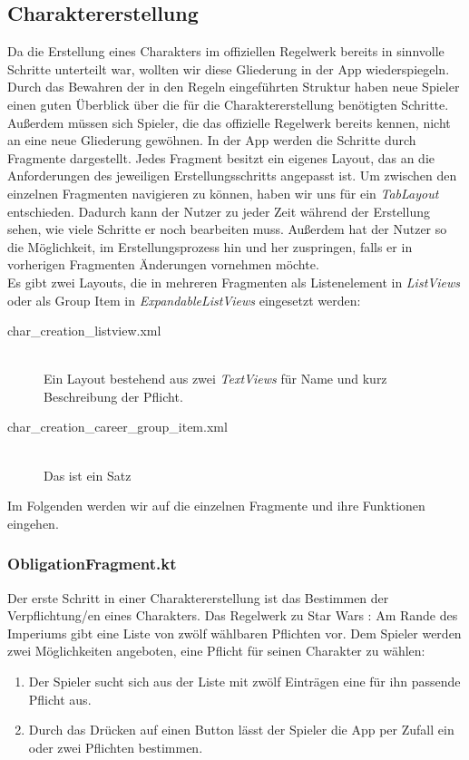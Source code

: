 \subsection{Charaktererstellung}
Da die Erstellung eines Charakters im offiziellen Regelwerk bereits in sinnvolle Schritte unterteilt war, wollten wir diese Gliederung in der App wiederspiegeln. Durch das Bewahren der in den Regeln eingeführten Struktur haben neue Spieler einen guten Überblick über die für die Charaktererstellung benötigten Schritte. Außerdem müssen sich Spieler, die das offizielle Regelwerk bereits kennen, nicht an eine neue Gliederung gewöhnen. In der App werden die Schritte durch Fragmente dargestellt. Jedes Fragment besitzt ein eigenes Layout, das an die Anforderungen des jeweiligen Erstellungsschritts angepasst ist. Um zwischen den einzelnen Fragmenten navigieren zu können, haben wir uns für ein \textit{TabLayout} entschieden. Dadurch kann der Nutzer zu jeder Zeit während der Erstellung sehen, wie viele Schritte er noch bearbeiten muss. Außerdem hat der Nutzer so die Möglichkeit, im Erstellungsprozess hin und her zuspringen, falls er in vorherigen Fragmenten Änderungen vornehmen möchte.\\

Es gibt zwei Layouts, die in mehreren Fragmenten als Listenelement in \textit{ListViews} oder als Group Item in \textit{ExpandableListViews} eingesetzt werden:
\begin{description}
\item[char\_creation\_listview.xml]\mbox{}\\ Ein Layout bestehend aus zwei \textit{TextViews} für Name und kurz Beschreibung der Pflicht.

\item[char\_creation\_career\_group\_item.xml]\mbox{}\\ Das ist ein Satz 
\end{description}


Im Folgenden werden wir auf die einzelnen Fragmente und ihre Funktionen eingehen.

\subsubsection{ObligationFragment.kt}
Der erste Schritt in einer Charaktererstellung ist das Bestimmen der Verpflichtung/en eines Charakters. Das Regelwerk zu \glqq Star Wars : Am Rande des Imperiums\grqq{}\cite[39]{rulebook} gibt eine Liste von zwölf wählbaren Pflichten vor. Dem Spieler werden zwei Möglichkeiten angeboten, eine Pflicht für seinen Charakter zu wählen:
\begin{enumerate}
\item Der Spieler sucht sich aus der Liste mit zwölf Einträgen eine für ihn passende Pflicht aus.
\item Durch das Drücken auf einen Button lässt der Spieler die App per Zufall ein oder zwei Pflichten bestimmen.
\end{enumerate}

